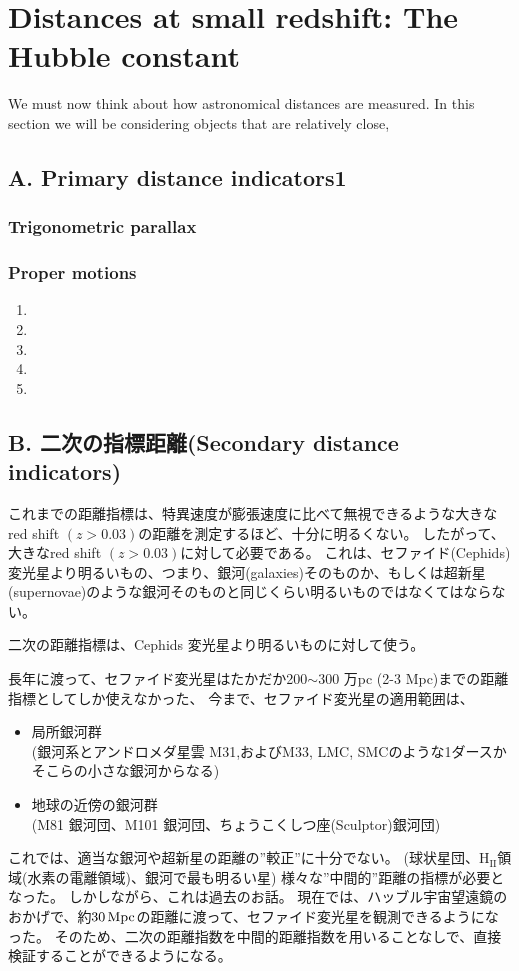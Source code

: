 \documentclass[11pt,a4paper,dvipdfmx]{jsarticle}
\theoremstyle{plain}
\theoremstyle{break}
\begin{document}
\section{Distances at small redshift: The Hubble constant}
\label{sec:1.3.Distances-at-small-redshift:}

We must now think about how astronomical distances are measured.
In this section we will be considering objects that are relatively close,


\subsection{A. Primary distance indicators1}
\subsubsection{Trigonometric parallax}
\subsubsection{Proper motions}
\begin{enumerate}
  \item
  \item
  \item
  \item
  \item
\end{enumerate}
\newpage
\subsection*{B. 二次の指標距離(Secondary distance indicators)}
これまでの距離指標は、特異速度が膨張速度に比べて無視できるような大きなred shift $(z> 0.03)$の距離を測定するほど、十分に明るくない。
したがって、大きなred shift $(z> 0.03)$に対して必要である。
これは、セファイド(Cephids)変光星より明るいもの、つまり、銀河(galaxies)そのものか、もしくは超新星(supernovae)のような銀河そのものと同じくらい明るいものではなくてはならない。
\begin{object}
  二次の距離指標は、Cephids 変光星より明るいものに対して使う。
\end{object}

長年に渡って、セファイド変光星はたかだか200$\sim$300 万pc (2-3 Mpc)までの距離指標としてしか使えなかった、
今まで、セファイド変光星の適用範囲は、
\begin{itemize}
  \item 局所銀河群\\
        (銀河系とアンドロメダ星雲 M31,およびM33, LMC, SMCのような1ダースかそこらの小さな銀河からなる)
  \item 地球の近傍の銀河群\\
        (M81 銀河団、M101 銀河団、ちょうこくしつ座(Sculptor)銀河団)
\end{itemize}
これでは、適当な銀河や超新星の距離の”較正”に十分でない。
(球状星団、$\mathrm{H_{II}}$領域(水素の電離領域)、銀河で最も明るい星)
様々な”中間的”距離の指標が必要となった。
しかしながら、これは過去のお話。
現在では、ハッブル宇宙望遠鏡のおかげで、約$30\,\rm{Mpc}$の距離に渡って、セファイド変光星を観測できるようになった。
そのため、二次の距離指数を中間的距離指数を用いることなしで、直接検証することができるようになる。
\end{document}

